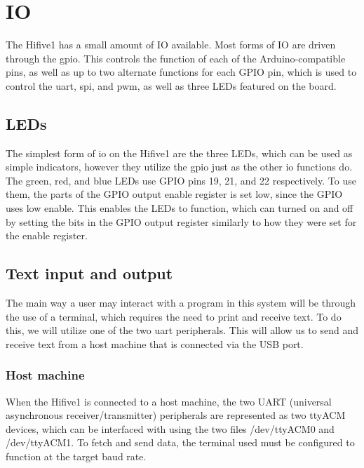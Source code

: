 \section{IO}
The Hifive1 has a small amount of IO available. Most forms of IO are driven through the \ac{gpio}. This controls the function of each of the Arduino-compatible pins, as well as up to two alternate functions for each GPIO pin, which is used to control the \ac{uart}, \ac{spi}, and \ac{pwm}, as well as three LEDs featured on the board. 
\subsection{LEDs}
The simplest form of \ac{io} on the Hifive1 are the three LEDs, which can be used as simple indicators, however they utilize the \ac{gpio} just as the other \ac{io} functions do. The green, red, and blue LEDs use GPIO pins 19, 21, and 22 respectively. To use them, the parts of the GPIO output enable register is set low, since the GPIO uses low enable. This enables the LEDs to function, which can turned on and off by setting the bits in the GPIO output register similarly to how they were set for the enable register.
\subsection{Text input and output}
The main way a user may interact with a program in this system will be through the use of a terminal, which requires the need to print and receive text. To do this, we will utilize one of the two \ac{uart} peripherals. This will allow us to send and receive text from a host machine that is connected via the USB port.
\subsubsection{Host machine}
When the Hifive1 is connected to a host machine, the two UART (universal asynchronous receiver/transmitter) peripherals are represented as two ttyACM devices, which can be interfaced with using the two files /dev/ttyACM0 and /dev/ttyACM1. To fetch and send data, the terminal used must be configured to function at the target baud rate.
